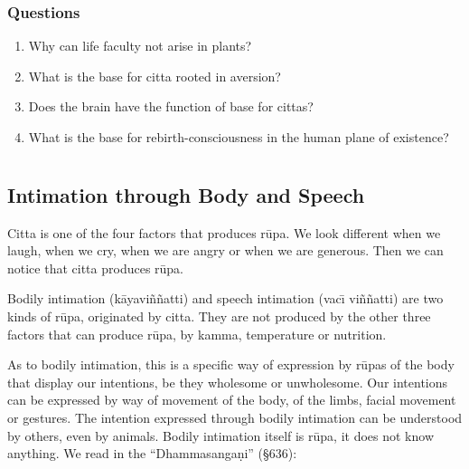 \documentclass{book}
\begin{document}
\subsection*{Questions}




\begin{enumerate}
\item Why can life faculty not arise in plants?

\item What is the base for citta rooted in aversion?

\item Does the brain have the function of base for cittas? 

\item What is the base for rebirth-consciousness in the human plane of 
existence?

\end{enumerate}
















\chapter[Intimation]{}
\section*{Intimation through Body and Speech}




Citta is one of the four factors that produces r\=upa. We look different
when we laugh, when we cry, when we are angry or when we are generous.
Then we can notice that citta produces r\=upa.

Bodily intimation (k{\=a}yavi\~n\~natti) and speech intimation
(vac\=\i{} vi\~n\-\~natti) are two kinds of r\=upa, originated by citta. They
are not produced by the other three factors that can produce r\=upa, by
kamma, temperature or nutrition.

As to bodily intimation, this is a specific way of expression by r\=upas
of the body that display our intentions, be they wholesome or
unwholesome. Our intentions can be expressed by way of movement of the
body, of the limbs, facial movement or gestures. The intention
expressed through bodily intimation can be understood by others, even
by animals. Bodily intimation itself is r\=upa, it does not know
anything. We read in the ``Dhamma\-sanga\d ni'' ({\S}636):
\end{document}
